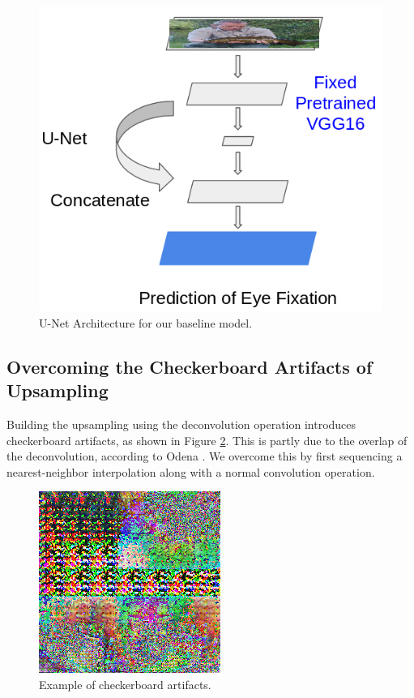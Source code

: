 \documentclass[10pt,twocolumn,letterpaper]{article}
\begin{document}
 \begin{figure}
	\begin{center}
		\includegraphics[width=\columnwidth]{figures/architecture_bl.png}
	\end{center}
	\caption{U-Net Architecture for our baseline model.}
	\label{fig:unet}
\end{figure}

\subsection{Overcoming the Checkerboard Artifacts of Upsampling} Building the
upsampling using the deconvolution operation introduces checkerboard artifacts,
as shown in Figure \ref{fig:checker}. This is partly due to the overlap of the
deconvolution, according to Odena \etal \cite{checkerboard}. We overcome this
by first sequencing a nearest-neighbor interpolation along with a normal
convolution operation.


 \begin{figure}
	\begin{center}
		\includegraphics[width=0.4\columnwidth]{figures/checker.png}
	\end{center}
	\caption{Example of checkerboard artifacts.}
	\label{fig:checker}
\end{figure}
\end{document}
